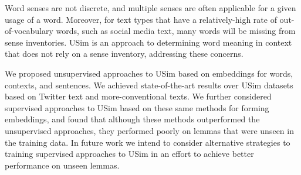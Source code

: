 \documentclass[11pt]{article}
\begin{document}
Word senses are not discrete, and multiple senses are often applicable
for a given usage of a word. Moreover, for text types that have a
relatively-high rate of out-of-vocabulary words, such as social media
text, many words will be missing from sense inventories. USim is an
approach to determining word meaning in context that does not rely on
a sense inventory, addressing these concerns.




We proposed unsupervised approaches to USim based on embeddings for
words, contexts, and sentences. We achieved state-of-the-art results
over USim datasets based on Twitter text and more-conventional
texts. We further considered supervised approaches to USim based on
these same methods for forming embeddings, and found that although
these methods outperformed the unsupervised approaches, they performed
poorly on lemmas that were unseen in the training data. In future work
we intend to consider alternative strategies to training supervised
approaches to USim in an effort to achieve better performance on
unseen lemmas.













%



%
\end{document}
